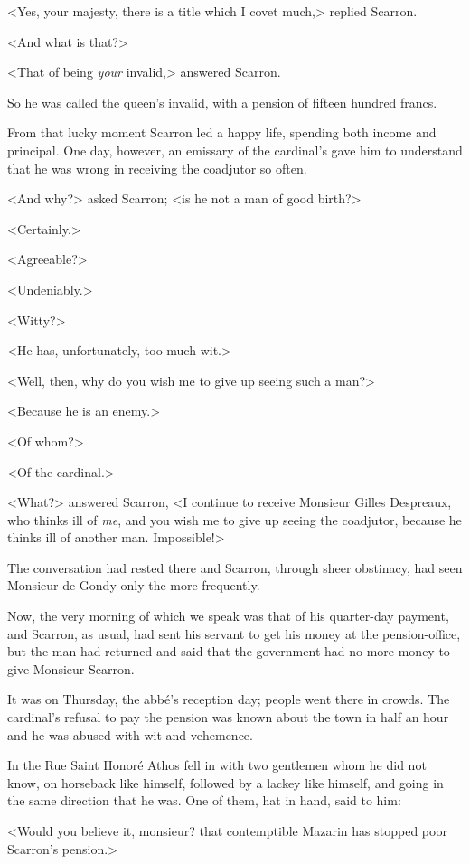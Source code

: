 <Yes, your majesty, there is a title which I covet much,> replied Scarron.

<And what is that?>

<That of being \emph{your} invalid,> answered Scarron.

So he was called the queen's invalid, with a pension of fifteen hundred francs.

From that lucky moment Scarron led a happy life, spending both income and principal. One day, however, an emissary of the cardinal's gave him to understand that he was wrong in receiving the coadjutor so often.

<And why?> asked Scarron; <is he not a man of good birth?>

<Certainly.>

<Agreeable?>

<Undeniably.>

<Witty?>

<He has, unfortunately, too much wit.>

<Well, then, why do you wish me to give up seeing such a man?>

<Because he is an enemy.>

<Of whom?>

<Of the cardinal.>

<What?> answered Scarron, <I continue to receive Monsieur Gilles Despreaux, who thinks ill of \emph{me}, and you wish me to give up seeing the coadjutor, because he thinks ill of another man. Impossible!>

The conversation had rested there and Scarron, through sheer obstinacy, had seen Monsieur de Gondy only the more frequently.

Now, the very morning of which we speak was that of his quarter-day payment, and Scarron, as usual, had sent his servant to get his money at the pension-office, but the man had returned and said that the government had no more money to give Monsieur Scarron.

It was on Thursday, the abbé's reception day; people went there in crowds. The cardinal's refusal to pay the pension was known about the town in half an hour and he was abused with wit and vehemence.

In the Rue Saint Honoré Athos fell in with two gentlemen whom he did not know, on horseback like himself, followed by a lackey like himself, and going in the same direction that he was. One of them, hat in hand, said to him:

<Would you believe it, monsieur? that contemptible Mazarin has stopped poor Scarron's pension.>

